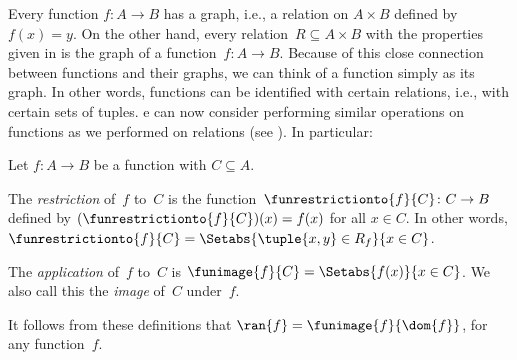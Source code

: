 \documentclass[../../../include/open-logic-section]{subfiles}
\begin{document}
\begin{explain}
Every function $f\colon A \to B$ has a graph, i.e., a relation on $A
\times B$ defined by $f(x) = y$. On the other hand, every relation~$R
\subseteq A \times B$ with the properties given in
 is the graph of a function~$f \colon A \to
B$. Because of this close connection between functions and their
graphs, we can think of a function simply as its graph. In other
words, functions can be identified with certain relations, i.e., with
certain sets of tuples. e can now consider performing similar operations on
functions as we performed on relations (see
). In particular:
\end{explain}

\begin{defn}
Let $f \colon A \to B$ be a function with $C\subseteq A$.

The \emph{restriction} of~$f$ to~$C$ is the
function~$\funrestrictionto{f}{C}\colon C \to B$ defined by
$(\funrestrictionto{f}{C})(x) = f(x)$ for all $x \in C$. In other
words, $\funrestrictionto{f}{C} = \Setabs{\tuple{x, y} \in R_f}{x \in
C}$.

The \emph{application} of~$f$ to~$C$ is $\funimage{f}{C} =
\Setabs{f(x)}{x \in C}$. We also call this the \emph{image} of~$C$
under~$f$.
\end{defn}

\begin{explain}
It follows from these definitions that $\ran{f} =
\funimage{f}{\dom{f}}$, for any function~$f$.
\end{explain}
\end{document}
